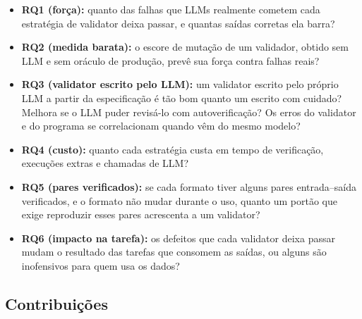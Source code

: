 \documentclass[sigconf,nonacm]{acmart}
\begin{document}
\begin{itemize}
\item \textbf{RQ1 (força):} quanto das falhas que LLMs realmente cometem cada estratégia de validator deixa passar, e quantas saídas corretas ela barra?
\item \textbf{RQ2 (medida barata):} o escore de mutação de um validador, obtido sem LLM e sem oráculo de produção, prevê sua força contra falhas reais?
\item \textbf{RQ3 (validator escrito pelo LLM):} um validator escrito pelo próprio LLM a partir da especificação é tão bom quanto um escrito com cuidado? Melhora se o LLM puder revisá-lo com autoverificação? Os erros do validator e do programa se correlacionam quando vêm do mesmo modelo?
\item \textbf{RQ4 (custo):} quanto cada estratégia custa em tempo de verificação, execuções extras e chamadas de LLM?
\item \textbf{RQ5 (pares verificados):} se cada formato tiver alguns pares entrada--saída verificados, e o formato não mudar durante o uso, quanto um portão que exige reproduzir esses pares acrescenta a um validator?
\item \textbf{RQ6 (impacto na tarefa):} os defeitos que cada validator deixa passar mudam o resultado das tarefas que consomem as saídas, ou alguns são inofensivos para quem usa os dados?
\end{itemize}

\subsection{Contribuições}
\end{document}
